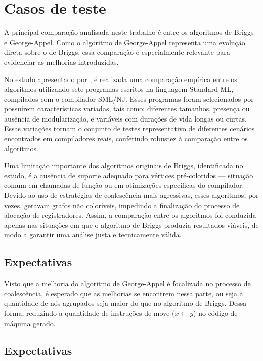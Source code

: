 \section{Casos de teste}

A principal comparação analisada neste trabalho é entre os algoritmos de Briggs e George-Appel.
Como o algoritmo de George-Appel representa uma evolução direta sobre o de Briggs, essa comparação é
especialmente relevante para evidenciar as melhorias introduzidas.

No estudo apresentado por \textcite{irc}, é realizada uma comparação empírica entre os algoritmos utilizando sete programas escritos na
linguagem Standard ML, compilados com o compilador SML/NJ. Esses programas foram selecionados por possuírem características variadas,
tais como: diferentes tamanhos, presença ou ausência de modularização, e variáveis com durações de vida longas ou curtas.
Essas variações tornam o conjunto de testes representativo de diferentes cenários encontrados em compiladores reais, conferindo robustez
à comparação entre os algoritmos.

Uma limitação importante dos algoritmos originais de Briggs, identificada no estudo, é a ausência de suporte adequado para vértices
pré-coloridos — situação comum em chamadas de função ou em otimizações específicas do compilador. Devido ao uso de estratégias de coalescência
mais agressivas, esses algoritmos, por vezes, geravam grafos não coloríveis, impedindo a finalização do processo de alocação de registradores.
Assim, a comparação entre os algoritmos foi conduzida apenas nas situações em que o algoritmo de Briggs produzia resultados viáveis, de modo
a garantir uma análise justa e tecnicamente válida.

\subsection{Expectativas}

Visto que a melhoria do algoritmo de George-Appel é focalizada no processo de coalescência, é esperado que as melhorias se encontrem nessa parte, ou seja
a quantidade de nós agrupados seja maior do que no algoritmo de Briggs. Dessa forma, reduzindo a quantidade de instruções de move 
($x \leftarrow y$) no código de máquina gerado.


\subsection{Expectativas}


